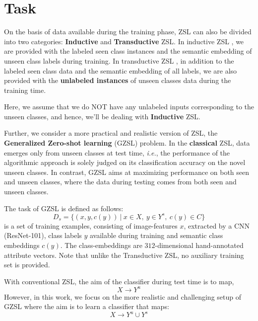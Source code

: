 \documentclass{article}
\begin{document}
\section{Task}
\label{task}
On the basis of data available during the training phase, ZSL can also be divided into two categories: \textbf{Inductive} and \textbf{Transductive} ZSL. 
In inductive ZSL \citep{sabr10, sabr14, sabr12, sabr17, sabr23, sabr29, sabr3, sabr25}, we are provided with the labeled seen class instances and the semantic embedding of unseen class labels during training. 
In transductive ZSL \citep{sabr21, sabr28}, in addition to the labeled seen class data and the semantic embedding of all labels, 
we are also provided with the \textbf{unlabeled instances} of unseen classes data during the training time.

Here, we assume that we do NOT have any unlabeled inputs corresponding to the unseen classes, and hence, we'll be dealing with \textbf{Inductive} ZSL.

Further, we consider a more practical and realistic version of ZSL, the \textbf{Generalized Zero-shot learning} (GZSL) problem. 
In the \textbf{classical} ZSL, data emerges only from unseen classes at test time, 
\textit{i.e.}, the performance of the algorithmic approach is solely judged on its classification accuracy on the novel unseen classes. 
In contrast, GZSL aims at maximizing performance on both seen and unseen classes, where the data during testing comes from both seen and unseen classes.

The task of GZSL is defined as follows:
\begin{equation}
D_s = \{(x, y, c(y))~|~x \in X,~ y \in Y^s, ~c(y) \in C\}
\end{equation}
is a set of training examples, consisting of image-features $x$, extracted by a CNN (ResNet-101), 
class labels $y$ available during training and semantic class embeddings $c(y)$. 
The class-embeddings are $312$-dimensional hand-annotated attribute vectors. Note that unlike the Transductive ZSL, no auxiliary training set is provided.

With conventional ZSL, the aim of the classifier during test time is to map,
\begin{equation}
X \to Y^u
\end{equation}
However, in this work, we focus on the more realistic and challenging setup of GZSL where the aim is to learn a classifier that maps: 
\begin{equation}
X \to Y^u \cup Y^s
\end{equation}
\end{document}
